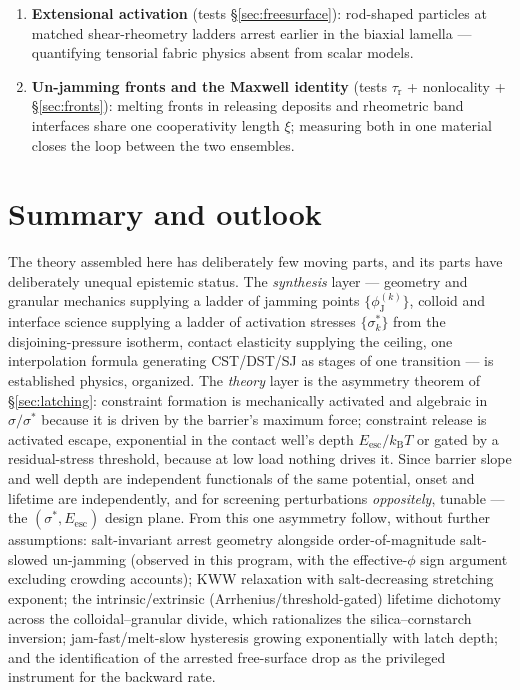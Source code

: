 \documentclass[11pt]{article}
\newcommand{\phiJ}{\phi_{\mathrm{J}}}
\newcommand{\sigmastar}{\sigma^{*}}
\begin{document}
\begin{enumerate}
\item \textbf{Extensional activation} (tests \S\ref{sec:freesurface}): rod-shaped particles at matched shear-rheometry ladders arrest earlier in the biaxial lamella --- quantifying tensorial fabric physics absent from scalar models.
\item \textbf{Un-jamming fronts and the Maxwell identity} (tests $\tau_{\mathrm{r}}$ + nonlocality + \S\ref{sec:fronts}): melting fronts in releasing deposits and rheometric band interfaces share one cooperativity length $\xi$; measuring both in one material closes the loop between the two ensembles.
\end{enumerate}

\section{Summary and outlook}

The theory assembled here has deliberately few moving parts, and its parts have deliberately unequal epistemic status. The \emph{synthesis} layer --- geometry and granular mechanics supplying a ladder of jamming points $\{\phiJ^{(k)}\}$, colloid and interface science supplying a ladder of activation stresses $\{\sigmastar_k\}$ from the disjoining-pressure isotherm, contact elasticity supplying the ceiling, one interpolation formula generating CST/DST/SJ as stages of one transition --- is established physics, organized. The \emph{theory} layer is the asymmetry theorem of \S\ref{sec:latching}: constraint formation is mechanically activated and algebraic in $\sigma/\sigmastar$ because it is driven by the barrier's maximum force; constraint release is activated escape, exponential in the contact well's depth $E_{\mathrm{esc}}/k_{\mathrm{B}}T$ or gated by a residual-stress threshold, because at low load nothing drives it. Since barrier slope and well depth are independent functionals of the same potential, onset and lifetime are independently, and for screening perturbations \emph{oppositely}, tunable --- the $(\sigmastar, E_{\mathrm{esc}})$ design plane. From this one asymmetry follow, without further assumptions: salt-invariant arrest geometry alongside order-of-magnitude salt-slowed un-jamming (observed in this program, with the effective-$\phi$ sign argument excluding crowding accounts); KWW relaxation with salt-decreasing stretching exponent; the intrinsic/extrinsic (Arrhenius/threshold-gated) lifetime dichotomy across the colloidal--granular divide, which rationalizes the silica--cornstarch inversion; jam-fast/melt-slow hysteresis growing exponentially with latch depth; and the identification of the arrested free-surface drop as the privileged instrument for the backward rate.
\end{document}
